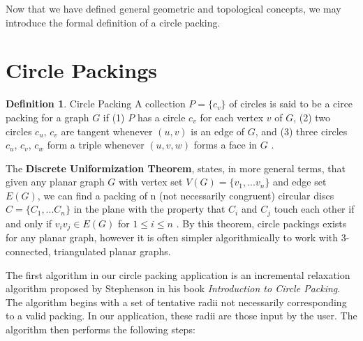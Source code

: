 \documentclass[11pt]{article}
\theoremstyle{definition}
\newtheorem{definition}{Definition}[section]
\begin{document}

Now that we have defined general geometric and topological concepts, we may introduce the formal definition of a circle packing.

\section{Circle Packings}
	\theoremstyle{definition}
	\begin{definition}{Circle Packing}
		A collection $P = \{c_v\}$ of circles is said to be a circe packing for a graph $G$ if 
		(1) $P$ has a circle $c_v$ for each vertex $v$ of $G$, 
		(2) two circles $c_u$, $c_v$ are tangent whenever $(u,v)$ is an edge of $G$, and 
		(3) three circles $c_u$, $c_v$, $c_w$ form a triple whenever $(u,v,w)$ forms a face in $G$ \cite{stephenson05introduction}.
	\end{definition}


The \textbf{Discrete Uniformization Theorem}, states, in more general terms, that given any planar graph $G$ with vertex set $V(G) = \{v_1, ... v_n \}$ and edge set $E(G)$, we can find a packing of n (not necessarily congruent) circular discs $C= \{C_1,... C_n\}$ in the plane with the property that $C_i$ and $C_j$ touch each other if and only if $v_i v_j \in E(G)$ for $1 \le i \le n$ \cite{stephenson05introduction}.
By this theorem, circle packings exists for any planar graph, however it is often simpler algorithmically to work with 3-connected, triangulated planar graphs.

	The first algorithm in our circle packing application is an incremental relaxation algorithm proposed by Stephenson in his book \emph{Introduction to Circle Packing}. 
	The algorithm begins with a set of tentative radii not necessarily corresponding to a valid packing. In our application, these radii are those input by the user. 
	The algorithm then performs the following steps:
	
\end{document}

